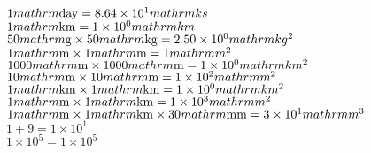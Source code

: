 \documentclass{article}
\begin{document}
\\$1\\mathrm{\mathrm{day}}=8.64\times10^{1}\\mathrm{ks\,}$\\
$1\\mathrm{\mathrm{km}}=1\times10^{0}\\mathrm{km\,}$\\
$50\\mathrm{\mathrm{g}}\times50\\mathrm{\mathrm{kg}}=2.50\times10^{0}\\mathrm{kg^{2}\,}$\\
$1\\mathrm{\mathrm{m}}\times1\\mathrm{\mathrm{m}}=1\\mathrm{m^{2}\,}$\\
$1000\\mathrm{\mathrm{m}}\times1000\\mathrm{\mathrm{m}}=1\times10^{0}\\mathrm{km^{2}\,}$\\
$10\\mathrm{\mathrm{m}}\times10\\mathrm{\mathrm{m}}=1\times10^{2}\\mathrm{m^{2}\,}$\\
$1\\mathrm{\mathrm{km}}\times1\\mathrm{\mathrm{km}}=1\times10^{0}\\mathrm{km^{2}\,}$\\
$1\\mathrm{\mathrm{m}}\times1\\mathrm{\mathrm{km}}=1\times10^{3}\\mathrm{m^{2}\,}$\\
$1\\mathrm{\mathrm{m}}\times1\\mathrm{\mathrm{km}}\times30\\mathrm{\mathrm{mm}}=3\times10^{1}\\mathrm{m^{3}\,}$\\
$1+9=1\times10^{1}$\\
$1\times10^{5}=1\times10^{5}$\\
\end{document}
